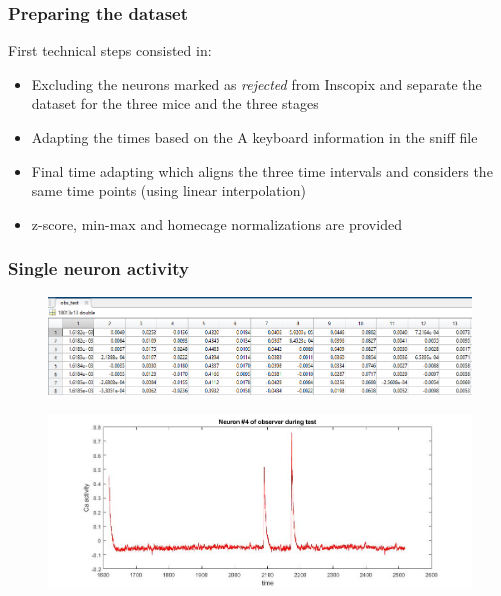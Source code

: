 \documentclass{beamer}
\begin{document}
\begin{frame}
\frametitle{Preparing the dataset}

First technical steps consisted in:

\begin{itemize}
	\item Excluding the neurons marked as \textit{rejected} from Inscopix and separate the dataset for the three mice and the three stages
	
	\item Adapting the times  based on the A keyboard information in the sniff file
	
	\item Final time adapting which aligns the three time intervals and considers the same time points (using linear interpolation)
	
	\item z-score, min-max and homecage normalizations are provided
	
	
	
\end{itemize}
\end{frame}	


\begin{frame}
\frametitle{Single neuron activity}

\begin{figure}[H]
	\begin{center}
		\includegraphics[scale=.45]{single_neuron_data.png} 
	\end{center} 
\end{figure}


\begin{figure}[H]
	\begin{center}
		\includegraphics[scale=.30]{neuron4.jpg} 
	\end{center} 
\end{figure}

\end{frame}	
\end{document}
